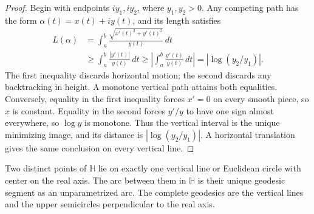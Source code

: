 \begin{proof}
Begin with endpoints $iy_1,iy_2$, where $y_1,y_2>0$. Any competing path has the form $\alpha(t)=x(t)+iy(t)$, and its length satisfies
\[
 \begin{aligned}
 L(\alpha)
 &=\int_a^b\frac{\sqrt{x'(t)^2+y'(t)^2}}{y(t)}\,dt\\
 &\geq\int_a^b\frac{|y'(t)|}{y(t)}\,dt
 \geq\left|\int_a^b\frac{y'(t)}{y(t)}\,dt\right|
 =|\log(y_2/y_1)|.
 \end{aligned}
\]
The first inequality discards horizontal motion; the second discards any backtracking in height. A monotone vertical path attains both equalities. Conversely, equality in the first inequality forces $x'=0$ on every smooth piece, so $x$ is constant. Equality in the second forces $y'/y$ to have one sign almost everywhere, so $\log y$ is monotone. Thus the vertical interval is the unique minimizing image, and its distance is $|\log(y_2/y_1)|$. A horizontal translation gives the same conclusion on every vertical line.
\end{proof}

\begin{theorem}\label{hyperbolic.geodesics}
Two distinct points of $\mathbb H$ lie on exactly one vertical line or Euclidean circle with center on the real axis. The arc between them in $\mathbb H$ is their unique geodesic segment as an unparametrized arc. The complete geodesics are the vertical lines and the upper semicircles perpendicular to the real axis.
\end{theorem}


